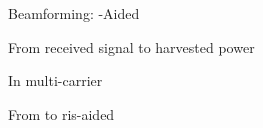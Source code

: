 \documentclass[presentation,xcolor={table},9pt]{beamer}
\begin{document}
\begin{section}{Beamforming: -Aided }
\begin{frame}{From received signal to harvested power}
\begin{alertblock}{In multi-carrier  \textellipsis}
\begin{figure}
{{					}
				}
			\end{figure}
		\end{alertblock}
	\end{frame}

	\begin{frame}{From  to \gls{ris}-aided }
		\begin{figure}[H]
			\centering
			\def\svgwidth{0.3\columnwidth}
			
		\end{figure}


\end{frame}
\end{section}
\end{document}
